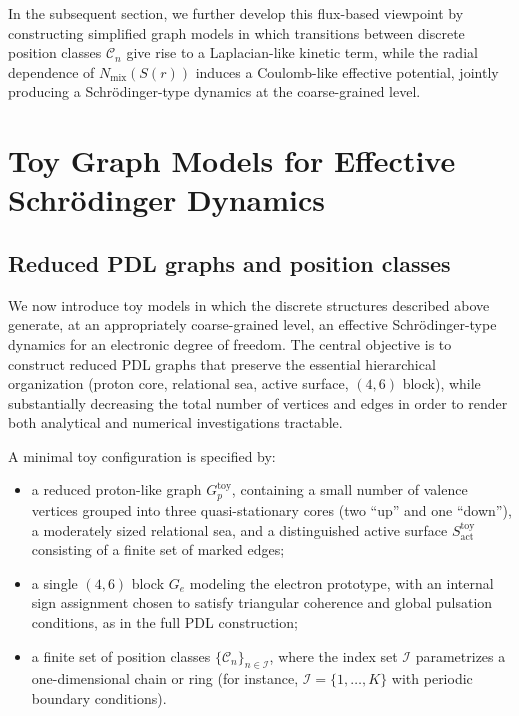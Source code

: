 \documentclass[11pt,a4paper]{article}
\begin{document}
In the subsequent section, we further develop this flux-based viewpoint by constructing simplified graph models in which transitions between discrete position classes $\mathcal{C}_{n}$ give rise to a Laplacian-like kinetic term, while the radial dependence of $N_{\mathrm{mix}}(S(r))$ induces a Coulomb-like effective potential, jointly producing a Schr\"odinger-type dynamics at the coarse-grained level.

\section{Toy Graph Models for Effective Schr\"odinger Dynamics}

\subsection{Reduced PDL graphs and position classes}

We now introduce toy models in which the discrete structures described above generate, at an appropriately coarse-grained level, an effective Schr\"odinger-type dynamics for an electronic degree of freedom.
The central objective is to construct reduced PDL graphs that preserve the essential hierarchical organization (proton core, relational sea, active surface, $(4,6)$ block), while substantially decreasing the total number of vertices and edges in order to render both analytical and numerical investigations tractable.\cite{Laubscher2026SchrodingerSketch}

A minimal toy configuration is specified by:
\begin{itemize}
  \item a reduced proton-like graph $G_{p}^{\mathrm{toy}}$, containing a small number of valence vertices grouped into three quasi-stationary cores (two ``up'' and one ``down''), a moderately sized relational sea, and a distinguished active surface $S_{\mathrm{act}}^{\mathrm{toy}}$ consisting of a finite set of marked edges;
  \item a single $(4,6)$ block $G_{e}$ modeling the electron prototype, with an internal sign assignment chosen to satisfy triangular coherence and global pulsation conditions, as in the full PDL construction;
  \item a finite set of position classes $\{\mathcal{C}_{n}\}_{n\in\mathcal{I}}$, where the index set $\mathcal{I}$ parametrizes a one-dimensional chain or ring (for instance, $\mathcal{I} = \{1,\dots,K\}$ with periodic boundary conditions).
\end{itemize}
\end{document}
